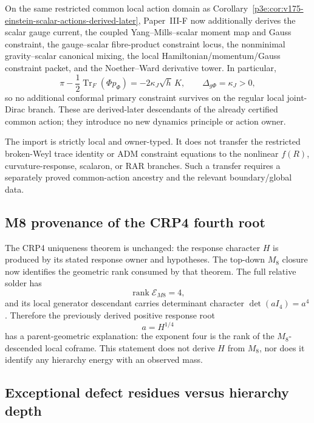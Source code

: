 \documentclass[12pt,a4paper]{article}
\begin{document}
\begin{corollary}
\label{p3e:cor:v176-local-bosonic-noether-constraint-derived-later}
On the same restricted common local action domain as
Corollary~\ref{p3e:cor:v175-einstein-scalar-actions-derived-later},
Paper~III-F now additionally derives the scalar gauge current, the coupled
Yang--Mills--scalar moment map and Gauss constraint, the gauge--scalar
fibre-product constraint locus, the nonminimal gravity--scalar canonical
mixing, the local Hamiltonian/momentum/Gauss constraint packet, and the
Noether--Ward derivative tower.  In particular,
\[
 \boxed{
 \pi-\frac12\operatorname{Tr}_F(\Phi p_\Phi)
 =-2\kappa_J\sqrt h\,K,\qquad
 \Delta_{g\Phi}=\kappa_J>0,}
\]
so no additional conformal primary constraint survives on the regular local
joint-Dirac branch.  These are derived-later descendants of the already
certified common action; they introduce no new dynamics principle or action
owner.

The import is strictly local and owner-typed.  It does not transfer the
restricted broken-Weyl trace identity or ADM constraint equations to the
nonlinear \(f(R)\), curvature-response, scalaron, or RAR branches.  Such a
transfer requires a separately proved common-action ancestry and the relevant
boundary/global data.
\end{corollary}


\subsection{M8 provenance of the CRP4 fourth root}
\label{p3e:sec:v187-m8-crp4-provenance}
The CRP4 uniqueness theorem is unchanged: the response character $H$ is
produced by its stated response owner and hypotheses.  The top-down $M_8$
closure now identifies the geometric rank consumed by that theorem.  The full
relative solder has
\[
 \operatorname{rank}\mathcal E_{M8}=4,
\]
and its local generator descendant carries determinant character
$\det(aI_4)=a^4$.  Therefore the previously derived positive response root
\[
 \boxed{a=H^{1/4}}
\]
has a parent-geometric explanation: the exponent four is the rank of the
$M_8$-descended local coframe.  This statement does not derive $H$ from
$M_8$, nor does it identify any hierarchy energy with an observed mass.


\subsection{Exceptional defect residues versus hierarchy depth}
\label{p3e:sec:v188-defect-residue-hierarchy}
\end{document}
